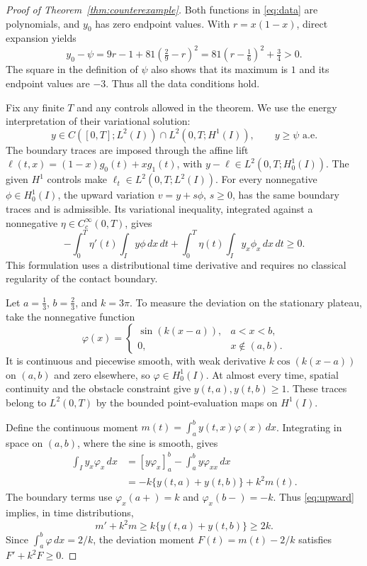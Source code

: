 \documentclass[11pt]{article}
\begin{document}
\begin{proof}[Proof of Theorem~\ref{thm:counterexample}]
Both functions in \eqref{eq:data} are polynomials, and $y_0$ has zero
endpoint values. With $r=x(1-x)$, direct expansion yields
\[
 y_0-\psi=9r-1+81(\tfrac29-r)^2
 =81(r-\tfrac16)^2+\tfrac34>0.
\]
The square in the definition of $\psi$ also shows that its maximum is $1$
and its endpoint values are $-3$. Thus all the data conditions hold.

Fix any finite $T$ and any controls allowed in the theorem. We use the
energy interpretation of their variational solution:
\begin{equation}\label{eq:energy}
 y\in C([0,T];L^2(I))\cap L^2(0,T;H^1(I)),\qquad y\ge\psi\text{ a.e.}
\end{equation}
The boundary traces are imposed through the affine lift
$\ell(t,x)=(1-x)g_0(t)+xg_1(t)$, with
$y-\ell\in L^2(0,T;H^1_0(I))$. The given $H^1$ controls make
$\ell_t\in L^2(0,T;L^2(I))$.
For every nonnegative $\phi\in H^1_0(I)$, the upward variation
$v=y+s\phi$, $s\ge0$, has the same boundary traces and is admissible.
Its variational inequality, integrated against a nonnegative
$\eta\in C^\infty_c(0,T)$, gives
\begin{equation}\label{eq:upward}
 -\int_0^T\eta'(t)\int_I y\phi\,dx\,dt
 +\int_0^T\eta(t)\int_I y_x\phi_x\,dx\,dt\ge0.
\end{equation}
This formulation uses a distributional time derivative and requires no
classical regularity of the contact boundary.

Let $a=\tfrac13$, $b=\tfrac23$, and $k=3\pi$. To measure the deviation on
the stationary plateau, take the nonnegative function
\[
 \varphi(x)=
 \begin{cases}
  \sin(k(x-a)),&a<x<b,\\
  0,&x\notin(a,b).
 \end{cases}
\]
It is continuous and piecewise smooth, with weak derivative
$k\cos(k(x-a))$ on $(a,b)$ and zero elsewhere, so
$\varphi\in H^1_0(I)$. At almost every time, spatial continuity and the
obstacle constraint give $y(t,a),y(t,b)\ge1$.
These traces belong to $L^2(0,T)$ by the bounded point-evaluation maps on
$H^1(I)$.

Define the continuous moment $m(t)=\int_a^b y(t,x)\varphi(x)\,dx$.
Integrating in space on $(a,b)$, where the sine is smooth, gives
\begin{align*}
 \int_I y_x\varphi_x\,dx
 &= [y\varphi_x]_a^b-\int_a^b y\varphi_{xx}\,dx\\
 &= -k\{y(t,a)+y(t,b)\}+k^2m(t).
\end{align*}
The boundary terms use $\varphi_x(a+)=k$ and $\varphi_x(b-)=-k$.
Thus \eqref{eq:upward} implies, in time distributions,
\[
 m'+k^2m\ge k\{y(t,a)+y(t,b)\}\ge2k.
\]
Since $\int_a^b\varphi\,dx=2/k$, the deviation moment
$F(t)=m(t)-2/k$ satisfies $F'+k^2F\ge0$.


\end{proof}
\end{document}
